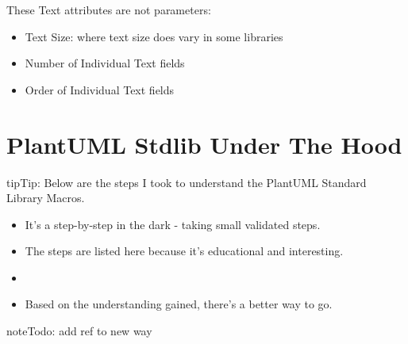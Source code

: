 \documentclass[letterpaper,10pt,english]{sphinxmanual}
\begin{document}
These Text attributes are not parameters:
\begin{itemize}
\item {} 
Text Size: where text size does vary in some libraries

\item {} 
Number of Individual Text fields

\item {} 
Order of Individual Text fields

\end{itemize}


\section{PlantUML Stdlib Under The Hood}
\label{\detokenize{StdlibUnderTheHood/StdlibUnderstanding:plantuml-stdlib-under-the-hood}}\label{\detokenize{StdlibUnderTheHood/StdlibUnderstanding:understandingstdlib-label}}\label{\detokenize{StdlibUnderTheHood/StdlibUnderstanding::doc}}
\begin{sphinxadmonition}{tip}{Tip:}
Below are the steps I took to understand the PlantUML Standard Library Macros.
\begin{itemize}
\item {} 
It’s a step-by-step in the dark - taking small validated steps.

\item {} 
The steps are listed here because it’s educational and interesting.

\item {} 

\item {} 
Based on the understanding gained, there’s a better way to go.

\end{itemize}

\end{sphinxadmonition}

\begin{sphinxadmonition}{note}{\label{\detokenize{StdlibUnderTheHood/StdlibUnderstanding:id1}}Todo:}
add ref to new way
\end{sphinxadmonition}
\end{document}
